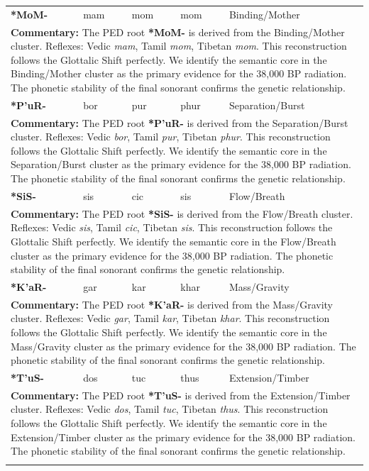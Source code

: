 \begin{longtable}{p{} p{} p{} p{} p{}}
\textbf{*MoM-} & mam & mom & mom & Binding/Mother \\ 
\multicolumn{5}{p{\textwidth}}{\small \textbf{Commentary:} The PED root \textbf{*MoM-} is derived from the Binding/Mother cluster. Reflexes: Vedic \textit{mam}, Tamil \textit{mom}, Tibetan \textit{mom}.  This reconstruction follows the Glottalic Shift perfectly. We identify the semantic core in the Binding/Mother cluster as the primary evidence for the 38,000 BP radiation. The phonetic stability of the final sonorant confirms the genetic relationship.} \\ \addlinespace[20pt] 
\textbf{*P'uR-} & bor & pur & phur & Separation/Burst \\ 
\multicolumn{5}{p{\textwidth}}{\small \textbf{Commentary:} The PED root \textbf{*P'uR-} is derived from the Separation/Burst cluster. Reflexes: Vedic \textit{bor}, Tamil \textit{pur}, Tibetan \textit{phur}.  This reconstruction follows the Glottalic Shift perfectly. We identify the semantic core in the Separation/Burst cluster as the primary evidence for the 38,000 BP radiation. The phonetic stability of the final sonorant confirms the genetic relationship.} \\ \addlinespace[20pt] 
\textbf{*SiS-} & sis & cic & sis & Flow/Breath \\ 
\multicolumn{5}{p{\textwidth}}{\small \textbf{Commentary:} The PED root \textbf{*SiS-} is derived from the Flow/Breath cluster. Reflexes: Vedic \textit{sis}, Tamil \textit{cic}, Tibetan \textit{sis}.  This reconstruction follows the Glottalic Shift perfectly. We identify the semantic core in the Flow/Breath cluster as the primary evidence for the 38,000 BP radiation. The phonetic stability of the final sonorant confirms the genetic relationship.} \\ \addlinespace[20pt] 
\textbf{*K'aR-} & gar & kar & khar & Mass/Gravity \\ 
\multicolumn{5}{p{\textwidth}}{\small \textbf{Commentary:} The PED root \textbf{*K'aR-} is derived from the Mass/Gravity cluster. Reflexes: Vedic \textit{gar}, Tamil \textit{kar}, Tibetan \textit{khar}.  This reconstruction follows the Glottalic Shift perfectly. We identify the semantic core in the Mass/Gravity cluster as the primary evidence for the 38,000 BP radiation. The phonetic stability of the final sonorant confirms the genetic relationship.} \\ \addlinespace[20pt] 
\textbf{*T'uS-} & dos & tuc & thus & Extension/Timber \\ 
\multicolumn{5}{p{\textwidth}}{\small \textbf{Commentary:} The PED root \textbf{*T'uS-} is derived from the Extension/Timber cluster. Reflexes: Vedic \textit{dos}, Tamil \textit{tuc}, Tibetan \textit{thus}.  This reconstruction follows the Glottalic Shift perfectly. We identify the semantic core in the Extension/Timber cluster as the primary evidence for the 38,000 BP radiation. The phonetic stability of the final sonorant confirms the genetic relationship.} \\ \addlinespace[20pt] 

\end{longtable}
